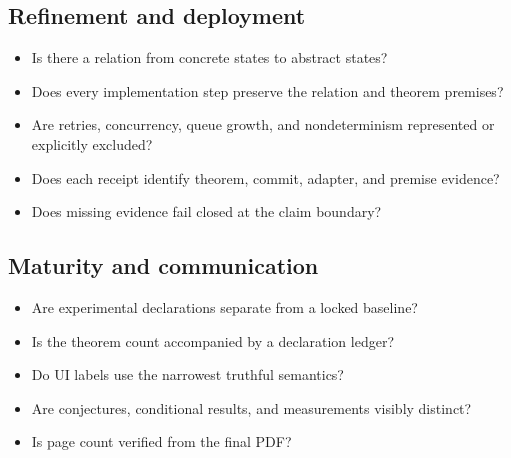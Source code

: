 \documentclass[10pt,letterpaper]{article}
\theoremstyle{definition}
\begin{document}
\subsection{Refinement and deployment}
\begin{itemize}
\item[$\square$] Is there a relation from concrete states to abstract states?
\item[$\square$] Does every implementation step preserve the relation and
  theorem premises?
\item[$\square$] Are retries, concurrency, queue growth, and nondeterminism
  represented or explicitly excluded?
\item[$\square$] Does each receipt identify theorem, commit, adapter, and
  premise evidence?
\item[$\square$] Does missing evidence fail closed at the claim boundary?
\end{itemize}

\subsection{Maturity and communication}
\begin{itemize}
\item[$\square$] Are experimental declarations separate from a locked baseline?
\item[$\square$] Is the theorem count accompanied by a declaration ledger?
\item[$\square$] Do UI labels use the narrowest truthful semantics?
\item[$\square$] Are conjectures, conditional results, and measurements
  visibly distinct?
\item[$\square$] Is page count verified from the final PDF?
\end{itemize}
\end{document}
